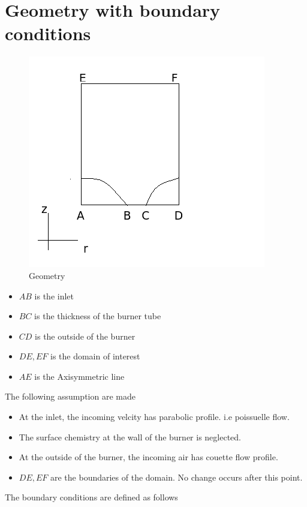\section{Geometry with boundary conditions}

\begin{figure}[h!]
  
  \centering
   \includegraphics[scale=0.5]{geometricbcs}
   \caption{Geometry}
\end{figure}
\begin{itemize}
\item $AB$ is the inlet
\item $BC$ is the thickness of the burner tube
\item $CD$ is the outside of the burner
\item $DE,EF$ is the domain of interest
\item $AE$ is the Axisymmetric line
\end{itemize}

\bigskip
\noindent The following assumption are made
\begin{itemize}
\item At the inlet, the incoming velcity has parabolic profile. i.e poissuelle flow. 
\item The surface chemistry at the wall of the burner is neglected. 
\item At the outside of the burner, the incoming air has couette flow profile. 
\item $DE,EF$ are the boundaries of the domain. No change occurs after this point. 
\end{itemize}
	
\noindent The boundary conditions are defined as follows 
\bigskip


